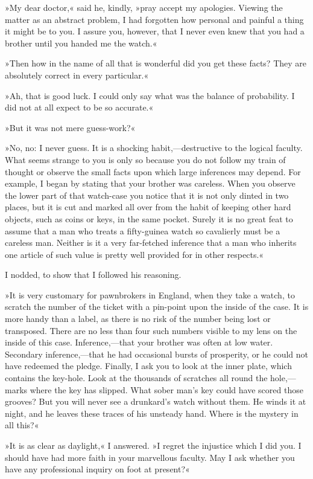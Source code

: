»My dear doctor,« said he, kindly, »pray accept my apologies. Viewing the matter as an abstract problem, I had forgotten how personal and painful a thing it might be to you. I assure you, however, that I never even knew that you had a brother until you handed me the watch.«

»Then how in the name of all that is wonderful did you get these facts? They are absolutely correct in every particular.«

»Ah, that is good luck. I could only say what was the balance of probability. I did not at all expect to be so accurate.«

»But it was not mere guess-work?«

»No, no: I never guess. It is a shocking habit,—destructive to the logical faculty. What seems strange to you is only so because you do not follow my train of thought or observe the small facts upon which large inferences may depend. For example, I began by stating that your brother was careless. When you observe the lower part of that watch-case you notice that it is not only dinted in two places, but it is cut and marked all over from the habit of keeping other hard objects, such as coins or keys, in the same pocket. Surely it is no great feat to assume that a man who treats a fifty-guinea watch so cavalierly must be a careless man. Neither is it a very far-fetched inference that a man who inherits one article of such value is pretty well provided for in other respects.«

I nodded, to show that I followed his reasoning.

»It is very customary for pawnbrokers in England, when they take a watch, to scratch the number of the ticket with a pin-point upon the inside of the case. It is more handy than a label, as there is no risk of the number being lost or transposed. There are no less than four such numbers visible to my lens on the inside of this case. Inference,—that your brother was often at low water. Secondary inference,—that he had occasional bursts of prosperity, or he could not have redeemed the pledge. Finally, I ask you to look at the inner plate, which contains the key-hole. Look at the thousands of scratches all round the hole,—marks where the key has slipped. What sober man's key could have scored those grooves? But you will never see a drunkard's watch without them. He winds it at night, and he leaves these traces of his unsteady hand. Where is the mystery in all this?«

»It is as clear as daylight,« I answered. »I regret the injustice which I did you. I should have had more faith in your marvellous faculty. May I ask whether you have any professional inquiry on foot at present?«

